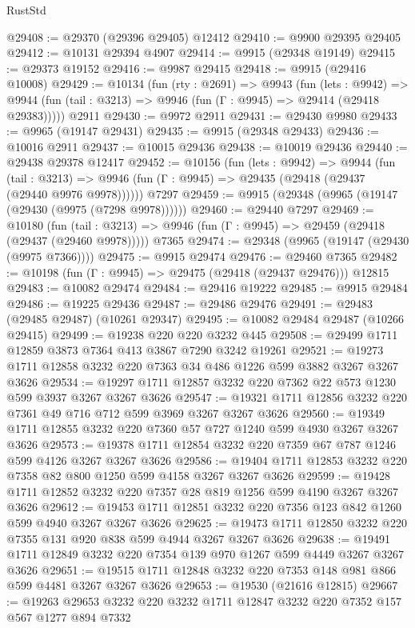 \begin{lexlean}{RustStd}
\begin{coremodule}
@29408 := @29370 (@29396 @29405) @12412
@29410 := @9900 @29395 @29405
@29412 := @10131 @29394 @4907
@29414 := @9915 (@29348 @19149)
@29415 := @29373 @19152
@29416 := @9987 @29415
@29418 := @9915 (@29416 @10008)
@29429 := @10134
    (fun (rty : @2691) =>
    @9943
      (fun (lets : @9942) =>
      @9944 (fun (tail : @3213) => @9946 (fun (Γ : @9945) => @29414 (@29418 @29383)))))
    @2911
@29430 := @9972 @2911
@29431 := @29430 @9980
@29433 := @9965 (@19147 @29431)
@29435 := @9915 (@29348 @29433)
@29436 := @10016 @2911
@29437 := @10015 @29436
@29438 := @10019 @29436
@29440 := @29438 @29378 @12417
@29452 := @10156
    (fun (lets : @9942) =>
    @9944
      (fun (tail : @3213) =>
      @9946 (fun (Γ : @9945) => @29435 (@29418 (@29437 (@29440 @9976 @9978))))))
    @7297
@29459 := @9915 (@29348 (@9965 (@19147 (@29430 (@9975 (@7298 @9978))))))
@29460 := @29440 @7297
@29469 := @10180
    (fun (tail : @3213) => @9946 (fun (Γ : @9945) => @29459 (@29418 (@29437 (@29460 @9978)))))
    @7365
@29474 := @29348 (@9965 (@19147 (@29430 (@9975 @7366))))
@29475 := @9915 @29474
@29476 := @29460 @7365
@29482 := @10198 (fun (Γ : @9945) => @29475 (@29418 (@29437 @29476))) @12815
@29483 := @10082 @29474
@29484 := @29416 @19222
@29485 := @9915 @29484
@29486 := @19225 @29436
@29487 := @29486 @29476
@29491 := @29483 (@29485 @29487) (@10261 @29347)
@29495 := @10082 @29484 @29487 (@10266 @29415)
@29499 := @19238 @220 @220 @3232 @445
@29508 := @29499 @1711 @12859 @3873 @7364 @413 @3867 @7290 @3242 @19261
@29521 := @19273 @1711 @12858 @3232 @220 @7363 @34 @486 @1226 @599 @3882 @3267 @3267 @3626
@29534 := @19297 @1711 @12857 @3232 @220 @7362 @22 @573 @1230 @599 @3937 @3267 @3267 @3626
@29547 := @19321 @1711 @12856 @3232 @220 @7361 @49 @716 @712 @599 @3969 @3267 @3267 @3626
@29560 := @19349 @1711 @12855 @3232 @220 @7360 @57 @727 @1240 @599 @4930 @3267 @3267 @3626
@29573 := @19378 @1711 @12854 @3232 @220 @7359 @67 @787 @1246 @599 @4126 @3267 @3267 @3626
@29586 := @19404 @1711 @12853 @3232 @220 @7358 @82 @800 @1250 @599 @4158 @3267 @3267 @3626
@29599 := @19428 @1711 @12852 @3232 @220 @7357 @28 @819 @1256 @599 @4190 @3267 @3267 @3626
@29612 := @19453 @1711 @12851 @3232 @220 @7356 @123 @842 @1260 @599 @4940 @3267 @3267 @3626
@29625 := @19473 @1711 @12850 @3232 @220 @7355 @131 @920 @838 @599 @4944 @3267 @3267 @3626
@29638 := @19491 @1711 @12849 @3232 @220 @7354 @139 @970 @1267 @599 @4449 @3267 @3267 @3626
@29651 := @19515 @1711 @12848 @3232 @220 @7353 @148 @981 @866 @599 @4481 @3267 @3267 @3626
@29653 := @19530 (@21616 @12815)
@29667 := @19263 @29653 @3232 @220 @3232 @1711 @12847 @3232 @220 @7352 @157 @567 @1277 @894 @7332

\end{coremodule}
\end{lexlean}
